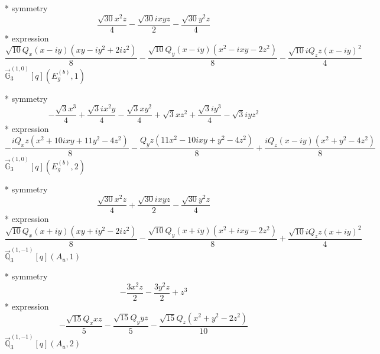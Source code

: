 \documentclass[fleqn,8pt]{jsarticle}
\begin{document}
\noindent\quad ** symmetry
\begin{dmath*}
\frac{\sqrt{30} x^{2} z}{4} - \frac{\sqrt{30} i x y z}{2} - \frac{\sqrt{30} y^{2} z}{4}
\end{dmath*}
\noindent\quad ** expression
\begin{dmath*}
\frac{\sqrt{10} Q_{x} \left(x - i y\right) \left(x y - i y^{2} + 2 i z^{2}\right)}{8} - \frac{\sqrt{10} Q_{y} \left(x - i y\right) \left(x^{2} - i x y - 2 z^{2}\right)}{8} - \frac{\sqrt{10} i Q_{z} z \left(x - i y\right)^{2}}{4}
\end{dmath*}
\noindent\quad $\vec{\mathbb{G}}_{3}^{(1,0)}[q](E_{g}^{(b)},1)$

\noindent\quad ** symmetry
\begin{dmath*}
- \frac{\sqrt{3} x^{3}}{4} + \frac{\sqrt{3} i x^{2} y}{4} - \frac{\sqrt{3} x y^{2}}{4} + \sqrt{3} x z^{2} + \frac{\sqrt{3} i y^{3}}{4} - \sqrt{3} i y z^{2}
\end{dmath*}
\noindent\quad ** expression
\begin{dmath*}
- \frac{i Q_{x} z \left(x^{2} + 10 i x y + 11 y^{2} - 4 z^{2}\right)}{8} - \frac{Q_{y} z \left(11 x^{2} - 10 i x y + y^{2} - 4 z^{2}\right)}{8} + \frac{i Q_{z} \left(x - i y\right) \left(x^{2} + y^{2} - 4 z^{2}\right)}{8}
\end{dmath*}
\noindent\quad $\vec{\mathbb{G}}_{3}^{(1,0)}[q](E_{g}^{(b)},2)$

\noindent\quad ** symmetry
\begin{dmath*}
\frac{\sqrt{30} x^{2} z}{4} + \frac{\sqrt{30} i x y z}{2} - \frac{\sqrt{30} y^{2} z}{4}
\end{dmath*}
\noindent\quad ** expression
\begin{dmath*}
\frac{\sqrt{10} Q_{x} \left(x + i y\right) \left(x y + i y^{2} - 2 i z^{2}\right)}{8} - \frac{\sqrt{10} Q_{y} \left(x + i y\right) \left(x^{2} + i x y - 2 z^{2}\right)}{8} + \frac{\sqrt{10} i Q_{z} z \left(x + i y\right)^{2}}{4}
\end{dmath*}
\noindent\quad $\vec{\mathbb{Q}}_{3}^{(1,-1)}[q](A_{u},1)$

\noindent\quad ** symmetry
\begin{dmath*}
- \frac{3 x^{2} z}{2} - \frac{3 y^{2} z}{2} + z^{3}
\end{dmath*}
\noindent\quad ** expression
\begin{dmath*}
- \frac{\sqrt{15} Q_{x} x z}{5} - \frac{\sqrt{15} Q_{y} y z}{5} - \frac{\sqrt{15} Q_{z} \left(x^{2} + y^{2} - 2 z^{2}\right)}{10}
\end{dmath*}
\noindent\quad $\vec{\mathbb{Q}}_{3}^{(1,-1)}[q](A_{u},2)$
\end{document}
